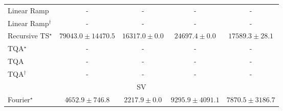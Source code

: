 \begin{tabular}{l|cccc|}
Linear Ramp & {\cellcolor[HTML]{000000}} \color[HTML]{F1F1F1} {\cellcolor{white}} \color{black} - & {\cellcolor[HTML]{000000}} \color[HTML]{F1F1F1} {\cellcolor{white}} \color{black} - & {\cellcolor[HTML]{000000}} \color[HTML]{F1F1F1} {\cellcolor{white}} \color{black} - & {\cellcolor[HTML]{000000}} \color[HTML]{F1F1F1} {\cellcolor{white}} \color{black} - \\
Linear Ramp$^\dagger$ & {\cellcolor[HTML]{000000}} \color[HTML]{F1F1F1} {\cellcolor{white}} \color{black} - & {\cellcolor[HTML]{000000}} \color[HTML]{F1F1F1} {\cellcolor{white}} \color{black} - & {\cellcolor[HTML]{000000}} \color[HTML]{F1F1F1} {\cellcolor{white}} \color{black} - & {\cellcolor[HTML]{000000}} \color[HTML]{F1F1F1} {\cellcolor{white}} \color{black} - \\
Recursive TS$^\star$ & {\cellcolor[HTML]{00472A}} \color[HTML]{F1F1F1} $79043.0\pm 14470.5$ & {\cellcolor[HTML]{FCFED6}} \color[HTML]{000000} $16317.0\pm 0.0$ & {\cellcolor[HTML]{EDF8B1}} \color[HTML]{000000} $24697.4\pm 0.0$ & {\cellcolor[HTML]{FBFDCF}} \color[HTML]{000000} $17589.3\pm 28.1$ \\
TQA$^\star$ & {\cellcolor[HTML]{000000}} \color[HTML]{F1F1F1} {\cellcolor{white}} \color{black} - & {\cellcolor[HTML]{000000}} \color[HTML]{F1F1F1} {\cellcolor{white}} \color{black} - & {\cellcolor[HTML]{000000}} \color[HTML]{F1F1F1} {\cellcolor{white}} \color{black} - & {\cellcolor[HTML]{000000}} \color[HTML]{F1F1F1} {\cellcolor{white}} \color{black} - \\
TQA & {\cellcolor[HTML]{000000}} \color[HTML]{F1F1F1} {\cellcolor{white}} \color{black} - & {\cellcolor[HTML]{000000}} \color[HTML]{F1F1F1} {\cellcolor{white}} \color{black} - & {\cellcolor[HTML]{000000}} \color[HTML]{F1F1F1} {\cellcolor{white}} \color{black} - & {\cellcolor[HTML]{000000}} \color[HTML]{F1F1F1} {\cellcolor{white}} \color{black} - \\
TQA$^\dagger$ & {\cellcolor[HTML]{000000}} \color[HTML]{F1F1F1} {\cellcolor{white}} \color{black} - & {\cellcolor[HTML]{000000}} \color[HTML]{F1F1F1} {\cellcolor{white}} \color{black} - & {\cellcolor[HTML]{000000}} \color[HTML]{F1F1F1} {\cellcolor{white}} \color{black} - & {\cellcolor[HTML]{000000}} \color[HTML]{F1F1F1} {\cellcolor{white}} \color{black} - \\
\cline{1-5}
\multicolumn{5}{c}{\rule{0pt}{8pt}SV} \\
\midrule
Fourier$^\star$ & {\cellcolor[HTML]{99B8D8}} \color[HTML]{000000} $4652.9\pm 746.8$ & {\cellcolor[HTML]{F0EAF4}} \color[HTML]{000000} $2217.9\pm 0.0$ & {\cellcolor[HTML]{023858}} \color[HTML]{F1F1F1} $9295.9\pm 4091.1$ & {\cellcolor[HTML]{04649D}} \color[HTML]{F1F1F1} $7870.5\pm 3186.7$ \\

\end{tabular}
